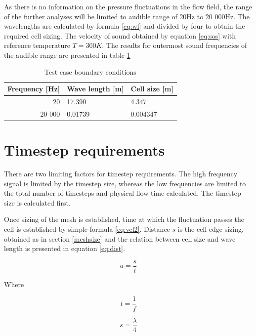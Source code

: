 As there is no information on the pressure fluctuations in the flow field, the range of the further analyses will be limited to audible range of 20Hz to 20 000Hz. The wavelengths are calculated by formula \ref{eq:wl} and divided by four to obtain the required cell sizing. The velocity of sound obtained by equation \ref{eq:sos} with reference temperature $T = 300K$. The results for outermost sound frequencies of the audible range are presented in table \ref{tab:meshsize}

\begin{table}[htb!]
\centering
\caption{Test case boundary conditions} \label{tab:meshsize}
\begin{tabular}{ | r | l | l | } \hline
Frequency [Hz] & Wave length [m] & Cell size [m] \\ \hline \hline
20 & 17.390 & 4.347  \\ \hline
20 000 & 0.01739 & 0.004347 \\ \hline
\end{tabular}
\end{table}

\section{Timestep requirements} \label{timestepsize}
There are two limiting factors for timestep requirements. The high frequency signal is limited by the timestep size, whereas the low frequencies are limited to the total number of timesteps and physical flow time calculated. The timestep size is calculated first.

Once sizing of the mesh is established, time at which the fluctuation passes the cell is established by simple formula \ref{eq:vel2}. Distance $s$ is the cell edge sizing, obtained as in section \ref{meshsize} and the relation between cell size and wave length is presented in equation \ref{eq:dist}.

\begin{equation} \label{eq:vel2}
a = \frac{s}{t}
\end{equation}

Where

\begin{equation} \label{eq:time}
t = \frac{1}{f}
\end{equation}

\begin{equation} \label{eq:dist}
s = \frac{\lambda}{4}
\end{equation}

